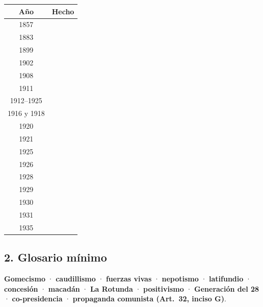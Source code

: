 \documentclass[12pt, letterpaper]{article}
\begin{document}
{\small
\begin{tabular}{@{}c p{14.2cm}@{}}
  \toprule
  \textbf{Año} & \textbf{Hecho} \\
  \midrule
  1857 & \dotfill \\
  1883 & \dotfill \\
  1899 & \dotfill \\
  1902 & \dotfill \\
  1908 & \dotfill \\
  1911 & \dotfill \\
  1912--1925 & \dotfill \\
  1916 y 1918 & \dotfill \\
  1920 & \dotfill \\
  1921 & \dotfill \\
  1925 & \dotfill \\
  1926 & \dotfill \\
  1928 & \dotfill \\
  1929 & \dotfill \\
  1930 & \dotfill \\
  1931 & \dotfill \\
  1935 & \dotfill \\
  \bottomrule
\end{tabular}
}

\subsection*{2. Glosario mínimo}
\noindent\small
\textbf{Gomecismo} · \textbf{caudillismo} · \textbf{fuerzas vivas} ·
\textbf{nepotismo} · \textbf{latifundio} · \textbf{concesión} ·
\textbf{macadán} · \textbf{La Rotunda} · \textbf{positivismo} ·
\textbf{Generación del 28} · \textbf{co-presidencia} ·
\textbf{propaganda comunista (Art.\ 32, inciso G)}.
\end{document}
